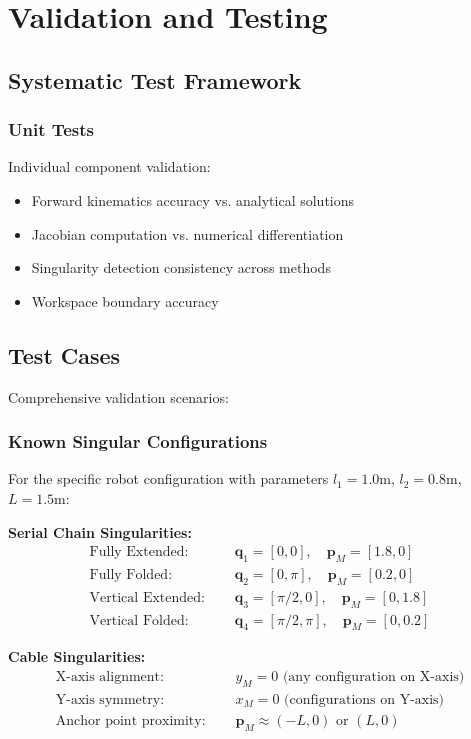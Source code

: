 \documentclass[11pt,a4paper]{article}
\begin{document}
\section{Validation and Testing}

\subsection{Systematic Test Framework}

\subsubsection{Unit Tests}
Individual component validation:
\begin{itemize}
    \item Forward kinematics accuracy vs. analytical solutions
    \item Jacobian computation vs. numerical differentiation
    \item Singularity detection consistency across methods
    \item Workspace boundary accuracy
\end{itemize}

\subsection{Test Cases}
Comprehensive validation scenarios:

\subsubsection{Known Singular Configurations}
For the specific robot configuration with parameters $l_1 = 1.0$m, $l_2 = 0.8$m, $L = 1.5$m:

\textbf{Serial Chain Singularities:}
\begin{align}
\text{Fully Extended: } &\quad \bm{q}_1 = [0, 0], \quad \bm{p}_M = [1.8, 0] \\
\text{Fully Folded: } &\quad \bm{q}_2 = [0, \pi], \quad \bm{p}_M = [0.2, 0] \\
\text{Vertical Extended: } &\quad \bm{q}_3 = [\pi/2, 0], \quad \bm{p}_M = [0, 1.8] \\
\text{Vertical Folded: } &\quad \bm{q}_4 = [\pi/2, \pi], \quad \bm{p}_M = [0, 0.2]
\end{align}

\textbf{Cable Singularities:}
\begin{align}
\text{X-axis alignment: } &\quad y_M = 0 \text{ (any configuration on X-axis)} \\
\text{Y-axis symmetry: } &\quad x_M = 0 \text{ (configurations on Y-axis)} \\
\text{Anchor point proximity: } &\quad \bm{p}_M \approx (-L, 0) \text{ or } (L, 0)
\end{align}
\end{document}
